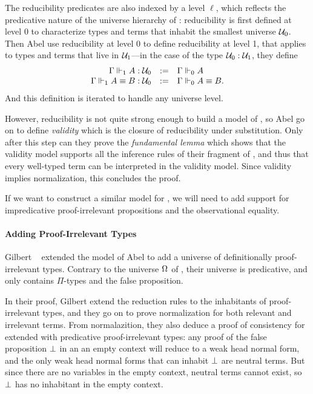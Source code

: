 The reducibility predicates are also indexed by a level \( \ell \), which reflects 
the predicative nature of the universe hierarchy of \MLTT: reducibility is 
first defined at level $0$ to characterize types and terms that inhabit the 
smallest universe \( \Type_0 \).
% 
Then Abel \etal use reducibility at level 0 to define reducibility at level 1, 
that applies to types and terms that live in \( \Type_1 \)---in the case of
the type \( \Type_0 : \Type_1 \), they define
\[
\begin{array}{rcl}
  \tytmReco{1}{\Gamma}{A}{\Type_0}{\Type_1} & := & \tytyReco{0}{\Gamma}{A}{\Type_0} \\
  \eqtmReco{1}{\Gamma}{A}{B}{\Type_0}{\Type_1} & := & \eqtyReco{0}{\Gamma}{A}{B}{\Type_0}. 
\end{array}
\]
% 
And this definition is iterated to handle any universe level.

However, reducibility is not quite strong enough to build a model of \MLTT, 
so Abel \etal go on to define \emph{validity} which is the closure 
of reducibility under substitution.
% 
Only after this step can they prove the \emph{fundamental lemma} which shows 
that the validity model supports all the inference rules of their fragment of
\MLTT, and thus that every well-typed term can be interpreted in the validity
model. Since validity implies normalization, this concludes the proof.

If we want to construct a similar model for \SetoidCC, we will need to add
support for impredicative proof-irrelevant propositions and the observational 
equality.

\paragraph*{Adding Proof-Irrelevant Types}
% 
Gilbert \etal~ extended the model of 
Abel \etal to add a universe of definitionally proof-irrelevant types.
Contrary to the universe \( \sProp \) of \SetoidCC, their universe is
predicative, and only contains \( \Pi \)-types and the false proposition.

In their proof, Gilbert \etal extend the reduction rules to the inhabitants of 
proof-irrelevant types, and they go on to prove normalization for both relevant
and irrelevant terms.
%
From normalazition, they also deduce a proof of consistency for \MLTT 
extended with predicative proof-irrelevant types: any proof of the false 
proposition \( \Empty \) in an an empty context will reduce to a weak head 
normal form, and the only weak head normal forms that can inhabit 
\( \Empty \) are neutral terms. 
% 
But since there are no variables in the empty context, neutral terms cannot 
exist, so \( \Empty \) has no inhabitant in the empty context.

